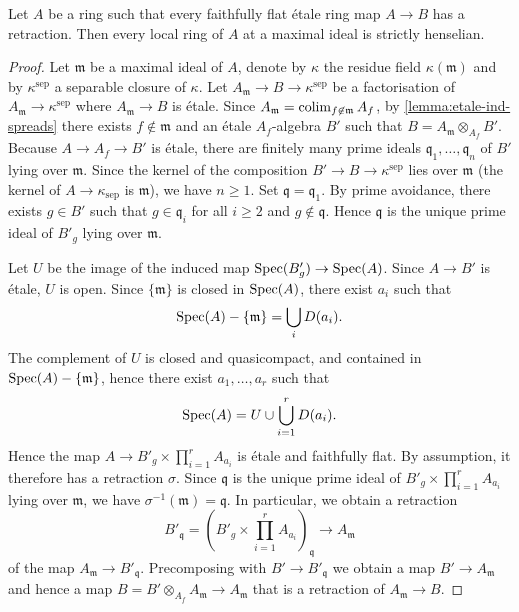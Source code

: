 \begin{lemma}
    Let $A$ be a ring such that every faithfully flat étale ring map $A \to B$ has
    a retraction. Then every local ring of $A$ at a maximal ideal is strictly henselian.
    \label{lemma:retractions-strictly-henselian}
\end{lemma}

\begin{proof}
    Let $\mathfrak{m}$ be a maximal ideal of $A$, denote by $\kappa$ the residue field $\kappa(\mathfrak{m})$
    and by $\kappa^{\mathrm{sep}}$ a separable closure of $\kappa$. Let
    $A_{\mathfrak{m}} \to B \to \kappa^{\mathrm{sep}}$ be a factorisation of $A_{\mathfrak{m}} \to \kappa^{\mathrm{sep}}$
    where $A_{\mathfrak{m}} \to B$ is étale. Since $A_{\mathfrak{m}} = \operatorname{colim}_{f \not\in \mathfrak{m}} A_f$,
    by \ref{lemma:etale-ind-spreads} there exists $f \not\in \mathfrak{m}$ and an étale $A_f$-algebra $B'$
    such that $B = A_{\mathfrak{m}} \otimes_{A_f} B'$.
    Because $A \to A_f \to B'$ is étale,
    there are finitely many prime ideals $\mathfrak{q}_1, \ldots, \mathfrak{q}_n$ of $B'$ lying over $\mathfrak{m}$.
    Since the kernel of the composition $B' \to B \to \kappa^{\mathrm{sep}}$ lies over $\mathfrak{m}$
    (the kernel of $A \to \kappa_{\mathrm{sep}}$ is $\mathfrak{m}$), we have $n \ge 1$.
    Set $\mathfrak{q} = \mathfrak{q}_1$. By prime avoidance, there exists $g \in B'$ such that
    $g \in \mathfrak{q}_i$ for all $i \ge 2$ and $g \not\in \mathfrak{q}$. Hence
    $\mathfrak{q}$ is the unique prime ideal of $B'_g$ lying over $\mathfrak{m}$.

    Let $U$ be the image of the induced map $\mathrm{Spec}(B'_g) \to \mathrm{Spec}(A)$. Since $A \to B'$ is étale, $U$ is open.
    Since $\{\mathfrak{m}\}$ is closed in $\mathrm{Spec}(A)$, there exist $a_i$ such that
    \[
        \mathrm{Spec}(A) - \{\mathfrak{m}\} = \bigcup_{i} D(a_i)
    .\] The complement of $U$ is closed and quasicompact, and contained in $\mathrm{Spec}(A) - \{\mathfrak{m}\}$, hence
    there exist $a_1, \ldots, a_r$ such that
    \[
        \mathrm{Spec}(A) = U \cup \bigcup_{i=1}^r D(a_i)
    .\] Hence the map $A \to B'_g \times \prod_{i=1}^{r} A_{a_i}$ is étale and faithfully flat. By assumption,
    it therefore has a retraction $\sigma$. Since $\mathfrak{q}$ is the unique prime ideal of $B'_g \times \prod_{i=1}^{r} A_{a_i}$
    lying over $\mathfrak{m}$, we have $\sigma^{-1}(\mathfrak{m}) = \mathfrak{q}$. In particular,
    we obtain a retraction
    \[
        B'_{\mathfrak{q}} = \left(B'_g \times \prod_{i=1}^{r} A_{a_i}\right)_{\mathfrak{q}} \to A_{\mathfrak{m}}
    \] of the map $A_{\mathfrak{m}} \to B'_{\mathfrak{q}}$. Precomposing with $B' \to B'_{\mathfrak{q}}$ we obtain
    a map $B' \to A_{\mathfrak{m}}$ and hence a map
    $B = B' \otimes_{A_f} A_{\mathfrak{m}} \to A_{\mathfrak{m}}$ that is a retraction of $A_{\mathfrak{m}} \to B$.
\end{proof}

